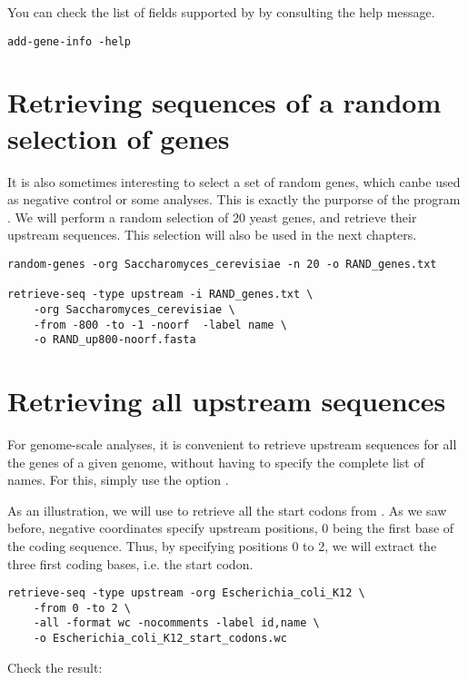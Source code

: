 You can check the list of fields supported by 
by consulting the help message.

\begin{lstlisting}
add-gene-info -help
\end{lstlisting}


\section{Retrieving sequences of a random selection of genes}

It is also sometimes interesting to select a set of random genes,
which canbe used as negative control or some analyses. This is exactly
the purporse of the program . We will perform a
random selection of 20 yeast genes, and retrieve their upstream
sequences. This selection will also be used in the next chapters.


\begin{lstlisting}
random-genes -org Saccharomyces_cerevisiae -n 20 -o RAND_genes.txt

retrieve-seq -type upstream -i RAND_genes.txt \
    -org Saccharomyces_cerevisiae \
    -from -800 -to -1 -noorf  -label name \
    -o RAND_up800-noorf.fasta
\end{lstlisting}

\section{Retrieving all upstream sequences}

For genome-scale analyses, it is convenient to retrieve upstream
sequences for all the genes of a given genome, without having to
specify the complete list of names. For this, simply use the option
\option{-all}.

As an illustration, we will use \command{retrieve-seq} to retrieve all
the start codons from . As we saw before,
negative coordinates specify upstream positions, 0 being the first
base of the coding sequence. Thus, by specifying positions 0 to 2, we
will extract the three first coding bases, i.e. the start codon. 

\begin{lstlisting}
retrieve-seq -type upstream -org Escherichia_coli_K12 \
    -from 0 -to 2 \
    -all -format wc -nocomments -label id,name \
    -o Escherichia_coli_K12_start_codons.wc
\end{lstlisting}

Check the result:

